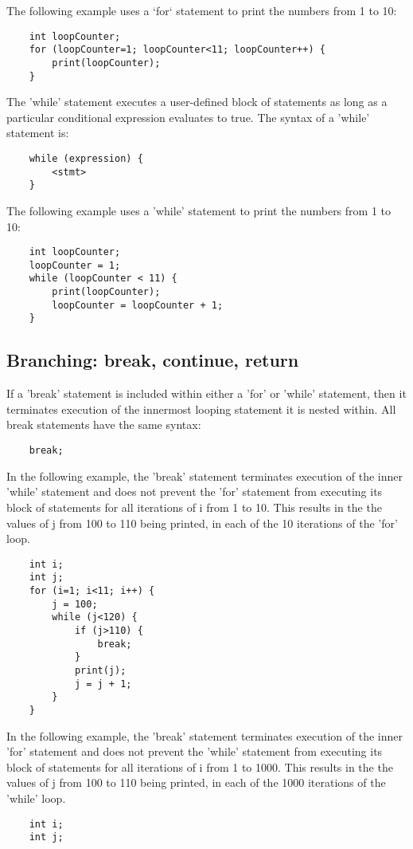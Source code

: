 \begin{homeworkProblem}
	
	The following example uses a `for` statement to print the numbers from 1 to 10:
	\begin{verbatim} 
	int loopCounter;
	for (loopCounter=1; loopCounter<11; loopCounter++) {
		print(loopCounter);
	}
	\end{verbatim}
	
	The 'while' statement executes a user-defined block of statements as long as a particular conditional expression evaluates to true. The syntax of a 'while' statement is:
	\begin{verbatim} 
	while (expression) {
		<stmt>
	}
	\end{verbatim}
	The following example uses a 'while' statement to print the numbers from 1 to 10:
	\begin{verbatim} 
	int loopCounter;
	loopCounter = 1;
	while (loopCounter < 11) {
		print(loopCounter);
		loopCounter = loopCounter + 1;
	}
	\end{verbatim}
	
	\subsection{Branching: break, continue, return}
	If a 'break' statement is included within either a 'for' or 'while' statement, then it  terminates execution of the innermost looping statement it is nested within. All break statements have the same syntax:
	\begin{verbatim} 
	break;
	\end{verbatim}
	
	In the following example, the 'break' statement terminates execution of the inner 'while' statement and does not prevent the 'for' statement from executing its block of statements for all iterations of i from 1 to 10. This results in the the values of j from 100 to 110 being printed, in each of the 10 iterations of the 'for' loop.
	\begin{verbatim} 
	int i;
	int j;
	for (i=1; i<11; i++) {
		j = 100;
		while (j<120) {
			if (j>110) {
				break;
			}
			print(j);
			j = j + 1;
		}
	}
	\end{verbatim}
	
	In the following example, the 'break' statement terminates execution of the inner 'for' statement and does not prevent the 'while' statement from executing its block of statements for all iterations of i from 1 to 1000. This results in the the values of j from 100 to 110 being printed, in each of the 1000 iterations of the 'while' loop.
	\begin{verbatim} 
	int i;
	int j;


\end{verbatim}
\end{homeworkProblem}
